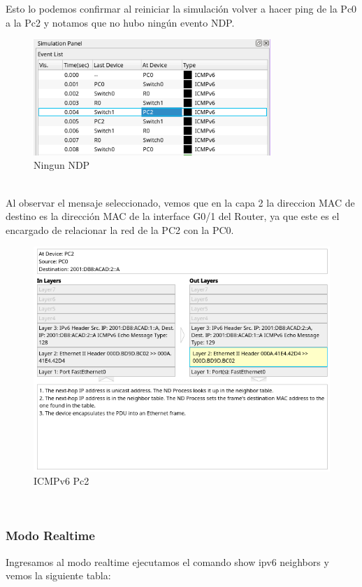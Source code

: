 \documentclass[a4paper,12pt]{article}
\begin{document}
Esto lo podemos confirmar al reiniciar la simulación volver a hacer ping de la Pc0 a la Pc2 y notamos que no hubo ningún evento NDP. \\
\begin{figure}[h]
    \centering
    \includegraphics[width=0.8\textwidth]{imagenes/6.png}
    \caption{Ningun NDP}
\end{figure}\\
\FloatBarrier
Al observar el mensaje seleccionado, vemos que en la capa 2 la direccion MAC de destino es la dirección MAC de la interface G0/1 del Router, ya que este es el encargado de relacionar la red de la PC2 con la PC0.\\
\begin{figure}[h]
    \centering
    \includegraphics[width=1\textwidth]{imagenes/7.png}
    \caption{ICMPv6 Pc2}
\end{figure}\\
\FloatBarrier
\subsubsection{Modo Realtime}
Ingresamos al modo realtime ejecutamos el comando show ipv6 neighbors y vemos la siguiente tabla:\\
\end{document}
